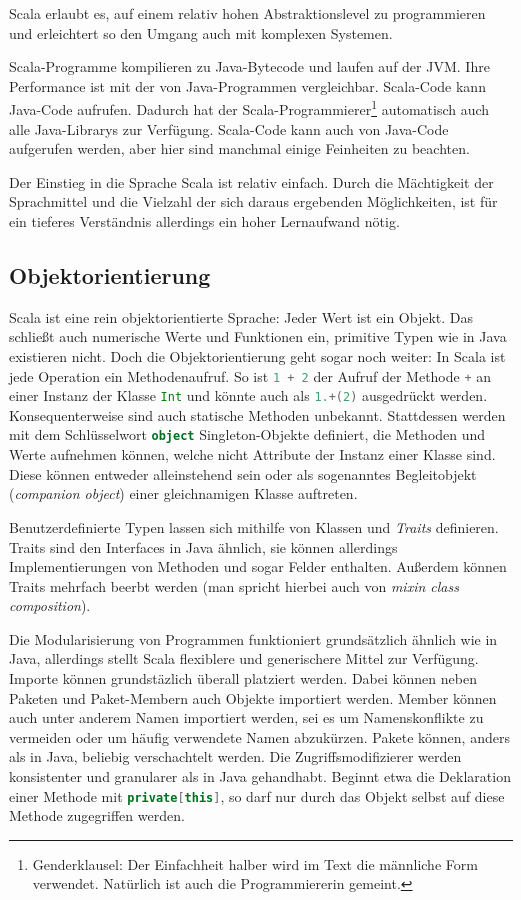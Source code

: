 \documentclass[a4paper, 12pt, hidelinks, listof=totoc, listoftables=totoc, bibliography=totoc]{scrreprt}
\newcommand{\scala}[1]{\lstinline[language=Scala, style=inline]|#1|}
\begin{document}
Scala erlaubt es, auf einem relativ hohen Abstraktionslevel zu programmieren und erleichtert so den Umgang auch mit komplexen Systemen.

Scala-Programme kompilieren zu Java-Bytecode und laufen auf der \ac{JVM}. Ihre Performance ist mit der von Java-Programmen vergleichbar. Scala-Code kann Java-Code aufrufen. Dadurch hat der Scala-Programmierer\footnote{Genderklausel: Der Einfachheit halber wird im Text die männliche Form verwendet. Natürlich ist auch die Programmiererin gemeint.} automatisch auch alle Java-Librarys zur Verfügung. Scala-Code kann auch von Java-Code aufgerufen werden, aber hier sind manchmal einige Feinheiten zu beachten. \cite[S. 13 ff.]{odersky2008.PIS}

Der Einstieg in die Sprache Scala ist relativ einfach. Durch die Mächtigkeit der Sprachmittel und die Vielzahl der sich daraus ergebenden Möglichkeiten, ist für ein tieferes Verständnis allerdings ein hoher Lernaufwand nötig.



\subsection{Objektorientierung}

Scala ist eine rein objektorientierte Sprache: Jeder Wert ist ein Objekt. Das schließt auch numerische Werte und Funktionen ein, primitive Typen wie in Java existieren nicht. Doch die Objektorientierung geht sogar noch weiter: In Scala ist jede Operation ein Methodenaufruf. So ist \scala{1 + 2} der Aufruf der Methode \scala{+} an einer Instanz der Klasse \scala{Int} und könnte auch als \scala{1.+(2)} ausgedrückt werden. Konsequenterweise sind auch statische Methoden unbekannt. Stattdessen werden mit dem Schlüsselwort \scala{object} Singleton-Objekte definiert, die Methoden und Werte aufnehmen können, welche nicht Attribute der Instanz einer Klasse sind. Diese können entweder alleinstehend sein oder als sogenanntes Begleitobjekt (\emph{companion object}) einer gleichnamigen Klasse auftreten.

Benutzerdefinierte Typen lassen sich mithilfe von Klassen und \emph{Traits} definieren. Traits sind den Interfaces in Java ähnlich, sie können allerdings Implementierungen von Methoden und sogar Felder enthalten. Außerdem können Traits mehrfach beerbt werden (man spricht hierbei auch von \emph{mixin class composition}).

Die Modularisierung von Programmen funktioniert grundsätzlich ähnlich wie in Java, allerdings stellt Scala flexiblere und generischere Mittel zur Verfügung. Importe können grundstäzlich überall platziert werden. Dabei können neben Paketen und Paket-Membern auch Objekte importiert werden. Member können auch unter anderem Namen importiert werden, sei es um Namenskonflikte zu vermeiden oder um häufig verwendete Namen abzukürzen.
Pakete können, anders als in Java, beliebig verschachtelt werden. Die Zugriffsmodifizierer werden konsistenter und granularer als in Java gehandhabt. Beginnt etwa die Deklaration einer Methode mit \scala{private[this]}, so darf nur durch das Objekt selbst auf diese Methode zugegriffen werden. \cite[S. 9 f., S. 233 ff.]{odersky2008.PIS}\cite{scala-lang.ATS}
\end{document}
